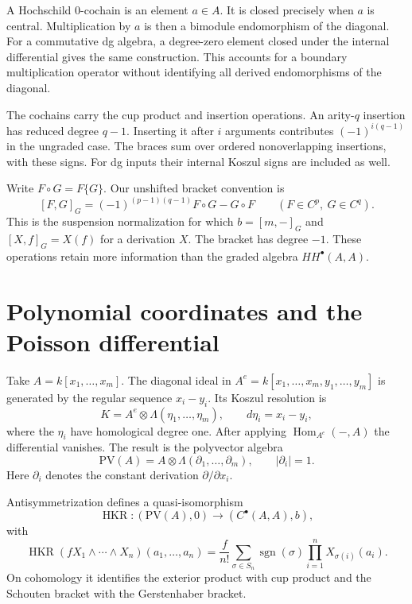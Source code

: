 A Hochschild $0$-cochain is an element $a\in A$. It is closed
precisely when $a$ is central. Multiplication by $a$ is then a
bimodule endomorphism of the diagonal. For a commutative dg algebra,
a degree-zero element closed under the internal differential gives
the same construction. This accounts for a boundary multiplication
operator without identifying all derived endomorphisms of the
diagonal.

The cochains carry the cup product and insertion operations. An
arity-$q$ insertion has reduced degree $q-1$. Inserting it after
$i$ arguments contributes $(-1)^{i(q-1)}$ in the ungraded case.
The braces sum over ordered nonoverlapping insertions, with these
signs. For dg inputs their internal Koszul signs are included as
well. 

Write $F\circ G=F\{G\}$. Our unshifted bracket convention is
\[
 [F,G]_G=(-1)^{(p-1)(q-1)}F\circ G-G\circ F
 \qquad(F\in C^p,\ G\in C^q).
\]
This is the suspension normalization for which $b=[m,-]_G$ and
$[X,f]_G=X(f)$ for a derivation $X$. The bracket has degree $-1$.
These operations retain more
information than the graded algebra $HH^\bullet(A,A)$.

\section{Polynomial coordinates and the Poisson differential}

Take $A=k[x_1,\ldots,x_m]$. The diagonal ideal in
$A^e=k[x_1,\ldots,x_m,y_1,\ldots,y_m]$ is generated by the regular
sequence $x_i-y_i$. Its Koszul resolution is
\[
 K=A^e\otimes\Lambda(\eta_1,\ldots,\eta_m),
 \qquad d\eta_i=x_i-y_i,
\]
where the $\eta_i$ have homological degree one. After applying
$\operatorname{Hom}_{A^e}(-,A)$ the differential vanishes. The
result is the polyvector algebra
\[
 \mathrm{PV}(A)=A\otimes\Lambda(\partial_1,\ldots,\partial_m),
 \qquad |\partial_i|=1.
\]
Here $\partial_i$ denotes the constant derivation
$\partial/\partial x_i$.

\begin{proposition}\label{mht:prop:polynomial-hkr}
Antisymmetrization defines a quasi-isomorphism
\[
 \operatorname{HKR}:(\mathrm{PV}(A),0)
             \longrightarrow(C^\bullet(A,A),b),
\]
with
\[
 \operatorname{HKR}(fX_1\wedge\cdots\wedge X_n)(a_1,\ldots,a_n)
 =\frac f{n!}\sum_{\sigma\in S_n}\operatorname{sgn}(\sigma)
           \prod_{i=1}^nX_{\sigma(i)}(a_i).
\]
On cohomology it identifies the exterior product with cup product
and the Schouten bracket with the Gerstenhaber bracket.
\end{proposition}

